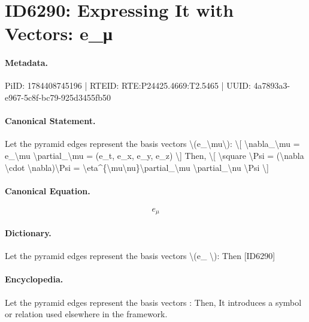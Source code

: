 \section*{ID6290: Expressing It with Vectors: e\_μ}
\paragraph{Metadata.}
PiID: 1784408745196 | RTEID: RTE:P24425.4669:T2.5465 | UUID: 4a7893a3-e967-5c8f-bc79-925d3455fb50

\paragraph{Canonical Statement.}
Let the pyramid edges represent the basis vectors \textbackslash{}(e\_\textbackslash{}mu\textbackslash{}): \textbackslash{}[ \textbackslash{}nabla\_\textbackslash{}mu = e\_\textbackslash{}mu \textbackslash{}partial\_\textbackslash{}mu = (e\_t, e\_x, e\_y, e\_z) \textbackslash{}] Then, \textbackslash{}[ \textbackslash{}square \textbackslash{}Psi = (\textbackslash{}nabla \textbackslash{}cdot \textbackslash{}nabla)\textbackslash{}Psi = \textbackslash{}eta\textasciicircum{}\{\textbackslash{}mu\textbackslash{}nu\}\textbackslash{}partial\_\textbackslash{}mu \textbackslash{}partial\_\textbackslash{}nu \textbackslash{}Psi \textbackslash{}]

\paragraph{Canonical Equation.}
\[
e_\mu
\]

\paragraph{Dictionary.}
Let the pyramid edges represent the basis vectors \textbackslash{}(e\_ \textbackslash{}): Then [ID6290]

\paragraph{Encyclopedia.}
Let the pyramid edges represent the basis vectors : Then, It introduces a symbol or relation used elsewhere in the framework.
